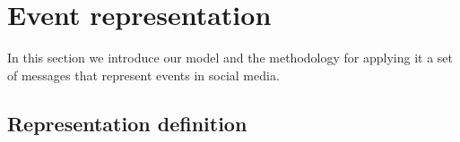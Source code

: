 \section{Event representation}\label{sec:model}

In this section we introduce our model and the methodology for applying it a set of messages that represent
events in social media.




\subsection{Representation definition}

